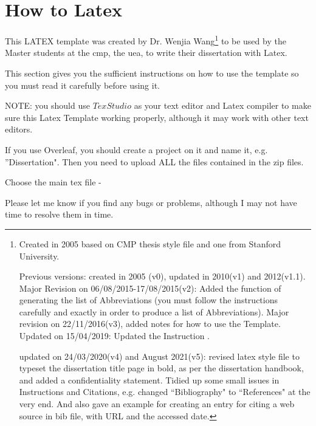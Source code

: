 \def\baselinestretch{1}

\chapter{How to Latex}

\def\baselinestretch{1.66}

This LATEX template was created by Dr. Wenjia Wang\footnote{Created in 2005 based on CMP thesis style file and one from Stanford University. 

Previous versions: created in 2005 (v0), updated in 2010(v1) and 2012(v1.1).  
	Major Revision on 06/08/2015-17/08/2015(v2): Added the function of generating the list of Abbreviations (you must follow the instructions carefully and exactly in order to produce a list of Abbreviations). 
	Major revision on 22/11/2016(v3), added notes for how to use the Template.   
	Updated on 15/04/2019: Updated the Instruction .
	
	updated on 24/03/2020(v4) and August 2021(v5): revised latex style file to typeset the dissertation title page in bold, as per the dissertation handbook, and added a confidentiality statement. 
	Tidied up some small issues in Instructions and Citations, e.g. changed ``Bibliography" to ``References" at the very end.
	And also gave an example for creating an entry for citing a web source in bib file, with URL and the accessed date. 
}
 to be used by the Master students at the \gls{cmp}, the \gls{uea}, to write their dissertation with Latex. 

This section gives you the sufficient instructions on how to use the template so you must read it carefully before using it.

NOTE: you should use $TexStudio$ as your text editor and Latex compiler to make sure this Latex Template working properly, although it may work with other text editors.

If you use Overleaf, you should create a project on it and name it, e.g. ''Dissertation". Then you need to upload ALL the files contained in the zip files. 

Choose the main tex file -       
 
Please let me know if you find any bugs or problems, although I may not have time to resolve them in time.
 
